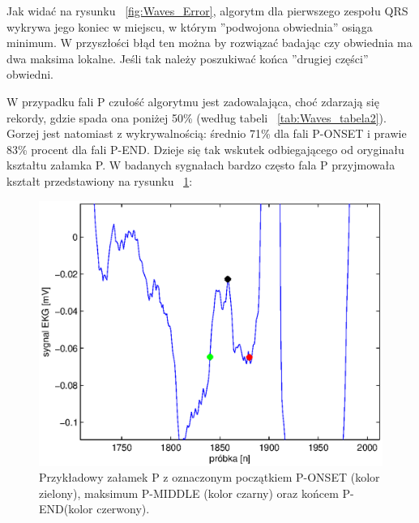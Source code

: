 Jak widać na rysunku ~\ref{fig:Waves_Error}, algorytm dla pierwszego zespołu QRS wykrywa jego koniec w miejscu, w którym ''podwojona obwiednia'' osiąga minimum. W przyszłości błąd ten można by rozwiązać badając czy obwiednia ma dwa maksima lokalne. Jeśli tak należy poszukiwać końca ''drugiej części'' obwiedni.

W przypadku fali P czułość algorytmu jest zadowalająca, choć zdarzają się rekordy, gdzie spada ona poniżej 50\% (według tabeli ~\ref{tab:Waves_tabela2}). Gorzej jest natomiast z wykrywalnością: średnio 71\% dla fali P-ONSET i prawie 83\% procent dla fali P-END. Dzieje się tak wskutek odbiegającego od oryginału kształtu załamka P. W badanych sygnałach bardzo często fala P przyjmowała kształt przedstawiony na rysunku ~\ref{fig:Waves_PrzykP}:

\begin{figure}[H]
\centering
\includegraphics[scale=0.9] {Waves/img/przykladowa_fala_p.eps}
\caption{Przykładowy załamek P z oznaczonym początkiem P-ONSET (kolor zielony), maksimum P-MIDDLE (kolor czarny) oraz końcem P-END(kolor czerwony).  }
\label{fig:Waves_PrzykP}
\end{figure}

